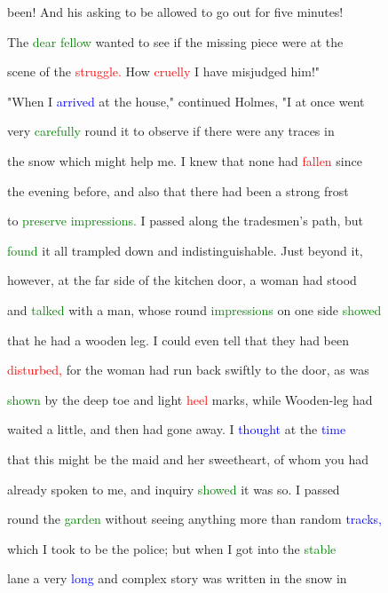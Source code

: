  been! And his asking to be allowed to go out for five minutes!

 The \textcolor{green}{dear} \textcolor{green}{fellow} wanted to see if the missing piece were at the

 scene of the \textcolor{red}{struggle.} How \textcolor{red}{cruelly} I have misjudged him!"



 "When I \textcolor{blue}{arrived} at the house," continued Holmes, "I at once went

 very \textcolor{green}{carefully} round it to observe if there were any traces in

 the snow which might help me. I knew that none had \textcolor{red}{fallen} since

 the evening before, and also that there had been a strong frost

 to \textcolor{green}{preserve} \textcolor{green}{impressions.} I passed along the tradesmen's path, but

 \textcolor{green}{found} it all trampled down and indistinguishable. Just beyond it,

 however, at the far side of the kitchen door, a woman had stood

 and \textcolor{green}{talked} with a man, whose round \textcolor{green}{impressions} on one side \textcolor{green}{showed}

 that he had a wooden leg. I could even tell that they had been

 \textcolor{red}{disturbed,} for the woman had run back swiftly to the door, as was

 \textcolor{green}{shown} by the deep toe and light \textcolor{red}{heel} marks, while Wooden-leg had

 \textcolor{BurntOrange}{waited} a little, and then had gone away. I \textcolor{blue}{thought} at the \textcolor{blue}{time}

 that this might be the maid and her \textcolor{BurntOrange}{sweetheart,} of whom you had

 already spoken to me, and \textcolor{BurntOrange}{inquiry} \textcolor{green}{showed} it was so. I passed

 round the \textcolor{green}{garden} without seeing anything more than random \textcolor{blue}{tracks,}

 which I took to be the \textcolor{BurntOrange}{police;} but when I got into the \textcolor{green}{stable}

 lane a very \textcolor{blue}{long} and complex story was written in the snow in


